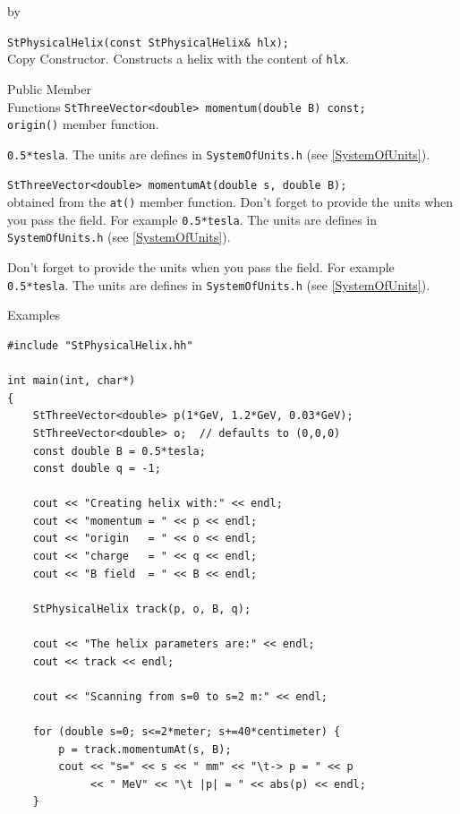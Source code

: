 \documentclass[twoside]{article}
\newcommand{\comp}[1]{\texttt{#1}}%
\newcommand{\entrylabel}[1]{\mbox{\textbf{{#1}}}\hfil}%
\newenvironment{entry}
{\begin{list}{}%
    {\renewcommand{\makelabel}{\entrylabel}%
     \setlength{\labelwidth}{90pt}%
     \setlength{\leftmargin}{\labelwidth}
     \advance\leftmargin by \labelsep%
      }%
    }%
  {\end{list}}
\newcommand{\Entrylabel}[1]%
{\raisebox{0pt}[1ex][0pt]{\makebox[\labelwidth][l]%
    {\parbox[t]{\labelwidth}{\hspace{0pt}\textbf{{#1}}}}}}
\newenvironment{Entry}%
{\renewcommand{\entrylabel}{\Entrylabel}\begin{entry}}%
  {\end{entry}}
\begin{document}
\begin{Entry}
    \verb+StPhysicalHelix(const StPhysicalHelix& hlx);+\\
    Copy Constructor. Constructs a helix with the content of \comp{hlx}.
            
\item[Public Member\\ Functions]
    \verb+StThreeVector<double> momentum(double B) const;+\\
    \comp{origin()} member function.
    
    \texttt{0.5*tesla}. The units are defines in \texttt{SystemOfUnits.h}
    (see \ref{SystemOfUnits}).

    \verb+StThreeVector<double> momentumAt(double s, double B);+\\
    obtained from the \comp{at()} member function.
    Don't forget to provide the units when you pass the field. For example
    \texttt{0.5*tesla}. The units are defines in \texttt{SystemOfUnits.h}
    (see \ref{SystemOfUnits}).
    
    Don't forget to provide the units when you pass the field. For example
    \texttt{0.5*tesla}. The units are defines in \texttt{SystemOfUnits.h}
    (see \ref{SystemOfUnits}).
    
\item[Examples]
{\footnotesize
\begin{verbatim}
#include "StPhysicalHelix.hh"

int main(int, char*)
{
    StThreeVector<double> p(1*GeV, 1.2*GeV, 0.03*GeV);
    StThreeVector<double> o;  // defaults to (0,0,0)
    const double B = 0.5*tesla;
    const double q = -1;

    cout << "Creating helix with:" << endl;
    cout << "momentum = " << p << endl;
    cout << "origin   = " << o << endl;
    cout << "charge   = " << q << endl;
    cout << "B field  = " << B << endl;

    StPhysicalHelix track(p, o, B, q);

    cout << "The helix parameters are:" << endl;
    cout << track << endl;
    
    cout << "Scanning from s=0 to s=2 m:" << endl;

    for (double s=0; s<=2*meter; s+=40*centimeter) {
        p = track.momentumAt(s, B);
        cout << "s=" << s << " mm" << "\t-> p = " << p
             << " MeV" << "\t |p| = " << abs(p) << endl; 
    }
    

\end{verbatim}}
\end{Entry}
\end{document}
